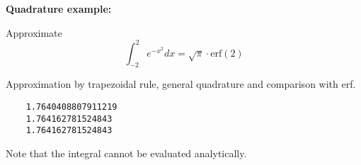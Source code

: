 \begin{minipage}[c]{0.6\textwidth}
	
\end{minipage}
\begin{minipage}[c]{0.05\textwidth}
\end{minipage}
\begin{minipage}[c]{0.35\textwidth}
	{\bf Quadrature example:}
	
	\bigskip
	Approximate
	\[
	\int_{-2}^2e^{-x^2}dx=\sqrt{\pi}\cdot\text{erf}(2)
	\]
	
	Approximation by trapezoidal rule, general quadrature and comparison with erf.
	\begin{verbatim}
	1.7640408807911219
	1.764162781524843
	1.764162781524843
	\end{verbatim}
	
	Note that the integral cannot be evaluated analytically.
	
	\vspace{0.25cm}
	
\end{minipage}
